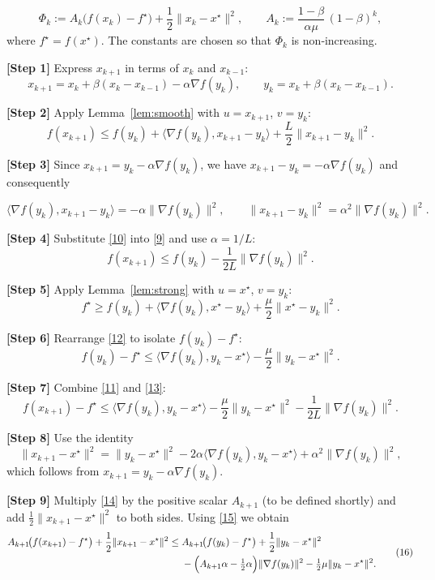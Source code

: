 \documentclass{article}
\begin{document}
\[
\Phi_{k}:=A_{k}\bigl(f(x_{k})-f^{\star}\bigr)
          +\frac{1}{2}\|x_{k}-x^{\star}\|^{2},
\qquad 
A_{k}:=\frac{1-\beta}{\alpha\mu} \,(1-\beta)^{k},
\tag{7}
\]
where $f^{\star}=f(x^{\star})$.  The constants are chosen so that $\Phi_{k}$
is non‑increasing.

\bigskip
\noindent\textbf{[Step 1]}  Express $x_{k+1}$ in terms of $x_{k}$ and $x_{k-1}$:
\[
x_{k+1}=x_{k}+ \beta(x_{k}-x_{k-1})-\alpha\nabla f(y_{k}),
\qquad y_{k}=x_{k}+ \beta(x_{k}-x_{k-1}).
\tag{8}
\]

\noindent\textbf{[Step 2]}  Apply Lemma~\ref{lem:smooth} with $u=x_{k+1}$,
$v=y_{k}$:
\[
f(x_{k+1})\le f(y_{k})+\langle\nabla f(y_{k}),x_{k+1}-y_{k}\rangle
            +\frac{L}{2}\|x_{k+1}-y_{k}\|^{2}.
\tag{9}
\]

\noindent\textbf{[Step 3]}  Since $x_{k+1}=y_{k}-\alpha\nabla f(y_{k})$, we have
$x_{k+1}-y_{k}=-\alpha\nabla f(y_{k})$ and consequently  

\[
\langle\nabla f(y_{k}),x_{k+1}-y_{k}\rangle
    =-\alpha\|\nabla f(y_{k})\|^{2},
\qquad
\|x_{k+1}-y_{k}\|^{2}= \alpha^{2}\|\nabla f(y_{k})\|^{2}.
\tag{10}
\]

\noindent\textbf{[Step 4]}  Substitute \eqref{10} into \eqref{9} and use
$\alpha=1/L$:
\[
f(x_{k+1})\le f(y_{k})-\frac{1}{2L}\|\nabla f(y_{k})\|^{2}.
\tag{11}
\]

\noindent\textbf{[Step 5]}  Apply Lemma~\ref{lem:strong} with $u=x^{\star}$,
$v=y_{k}$:
\[
f^{\star}\ge f(y_{k})+\langle\nabla f(y_{k}),x^{\star}-y_{k}\rangle
            +\frac{\mu}{2}\|x^{\star}-y_{k}\|^{2}.
\tag{12}
\]

\noindent\textbf{[Step 6]}  Rearrange \eqref{12} to isolate $f(y_{k})-f^{\star}$:
\[
f(y_{k})-f^{\star}\le
\langle\nabla f(y_{k}),y_{k}-x^{\star}\rangle
-\frac{\mu}{2}\|y_{k}-x^{\star}\|^{2}.
\tag{13}
\]

\noindent\textbf{[Step 7]}  Combine \eqref{11} and \eqref{13}:
\[
f(x_{k+1})-f^{\star}\le
\langle\nabla f(y_{k}),y_{k}-x^{\star}\rangle
-\frac{\mu}{2}\|y_{k}-x^{\star}\|^{2}
-\frac{1}{2L}\|\nabla f(y_{k})\|^{2}.
\tag{14}
\]

\noindent\textbf{[Step 8]}  Use the identity
\[
\|x_{k+1}-x^{\star}\|^{2}
= \|y_{k}-x^{\star}\|^{2}
   -2\alpha\langle\nabla f(y_{k}),y_{k}-x^{\star}\rangle
   +\alpha^{2}\|\nabla f(y_{k})\|^{2},
\tag{15}
\]
which follows from $x_{k+1}=y_{k}-\alpha\nabla f(y_{k})$.

\noindent\textbf{[Step 9]}  Multiply \eqref{14} by the positive scalar
$A_{k+1}$ (to be defined shortly) and add $\frac12\|x_{k+1}-x^{\star}\|^{2}$
to both sides.  Using \eqref{15} we obtain
\[
\begin{aligned}
A_{k+1}\!\bigl(f(x_{k+1})-f^{\star}\bigr)
+\frac12\|x_{k+1}-x^{\star}\|^{2}
\le
&\;A_{k+1}\!\bigl(f(y_{k})-f^{\star}\bigr)
+\frac12\|y_{k}-x^{\star}\|^{2}  \\
&\;-\Bigl(A_{k+1}\alpha-\tfrac12\alpha\Bigr)
   \|\nabla f(y_{k})\|^{2}
   -\tfrac12\mu\|y_{k}-x^{\star}\|^{2}.
\end{aligned}
\tag{16}
\]
\end{document}
